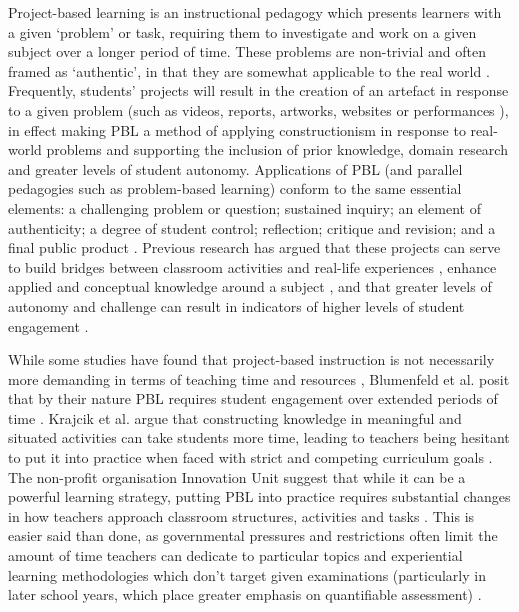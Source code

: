 \documentclass[,hyphens]{sigchi}
\begin{document}
Project-based learning is an instructional pedagogy which presents learners with a given `problem' or task, requiring them to investigate and work on a given subject over a longer period of time. These problems are non-trivial and often framed as `authentic', in that they are somewhat applicable to the real world \cite{Blumenfeld1991}. Frequently, students' projects will result in the creation of an artefact in response to a given problem (such as videos, reports, artworks, websites or performances \cite{Holubova2008}), in effect making PBL a method of applying constructionism in response to real-world problems and supporting the inclusion of prior knowledge, domain research and greater levels of student autonomy. Applications of PBL (and parallel pedagogies such as problem-based learning) conform to the same essential elements: a challenging problem or question; sustained inquiry; an element of authenticity; a degree of student control; reflection; critique and revision; and a final public product \cite{Larmer2015}. Previous research has argued that these projects can serve to build bridges between classroom activities and real-life experiences \cite{Blumenfeld1991}, enhance applied and conceptual knowledge around a subject \cite{Boaler1999}, and that greater levels of autonomy and challenge can result in indicators of higher levels of student engagement \cite{Wurdinger2007}.

While some studies have found that project-based instruction is not necessarily more demanding in terms of teaching time and resources \cite{Al-Balushi2014}, Blumenfeld et al. posit that by their nature PBL requires student engagement over extended periods of time \cite{Blumenfeld1991}. Krajcik et al. argue that constructing knowledge in meaningful and situated activities can take students more time, leading to teachers being hesitant to put it into practice when faced with strict and competing curriculum goals \cite{Krajcik2006}. The non-profit organisation Innovation Unit suggest that while it can be a powerful learning strategy, putting PBL into practice requires substantial changes in how teachers approach classroom structures, activities and tasks \cite{InnovationUnit2016}. This is easier said than done, as governmental pressures and restrictions often limit the amount of time teachers can dedicate to particular topics and experiential learning methodologies which don't target given examinations (particularly in later school years, which place greater emphasis on quantifiable assessment) \cite{Ofsted2018}.
\end{document}
